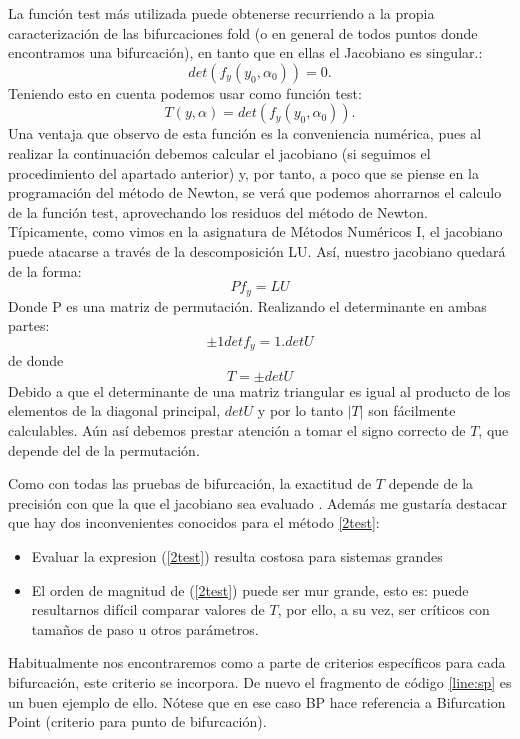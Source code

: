 La función test más utilizada puede obtenerse recurriendo a la propia caracterización de las bifurcaciones fold (o en general de todos puntos donde encontramos una bifurcación), en tanto que en ellas el Jacobiano es singular.:
\begin{equation}
det(f_y(y_0,\alpha_0))=0.
\end{equation}
Teniendo esto en cuenta podemos usar como función test:
\begin{equation}
T(y,\alpha)=det(f_y(y_0,\alpha_0)).
\label{2test}
\end{equation}
Una ventaja que observo de esta función es la conveniencia numérica, pues al realizar la continuación debemos calcular el jacobiano (si seguimos el procedimiento del apartado anterior) y, por tanto, a poco que se piense en la programación del método de Newton, se verá que podemos ahorrarnos el calculo de la función test, aprovechando los residuos del método de Newton.
Típicamente, como vimos en la asignatura de Métodos Numéricos I, el jacobiano puede atacarse a través de la descomposición LU. Así, nuestro jacobiano quedará de la forma:
\begin{equation}
Pf_y=LU
\end{equation}
Donde P es una matriz de permutación. Realizando el determinante en ambas partes:
\[ \pm1  det f_y=1.det U\]
de donde
\[ T= \pm det U \]
Debido a que el determinante de una matriz triangular es igual al producto de los elementos de la diagonal principal, $det U$ y por lo tanto $|T|$ son fácilmente calculables. Aún así debemos prestar atención a tomar el signo correcto de $T$, que depende del de la permutación.

 Como con todas las pruebas de bifurcación, la exactitud de $T$ depende de la precisión con que la que el jacobiano sea evaluado . Además me gustaría destacar que hay dos inconvenientes conocidos para el método \ref{2test}:
 \begin{itemize}
 	\item Evaluar la expresion (\ref{2test}) resulta costosa para sistemas grandes
 	\item El orden de magnitud de (\ref{2test}) puede ser mur grande, esto es: puede resultarnos difícil comparar valores de $T$, por ello, a su vez, ser críticos con tamaños de paso u otros parámetros.
 \end{itemize} 
 
Habitualmente nos encontraremos como a parte de criterios específicos para cada bifurcación, este criterio se incorpora. De nuevo el fragmento de código \ref{line:sp} es un buen ejemplo de ello. Nótese que en ese caso BP hace referencia a Bifurcation Point (criterio para punto de bifurcación).

